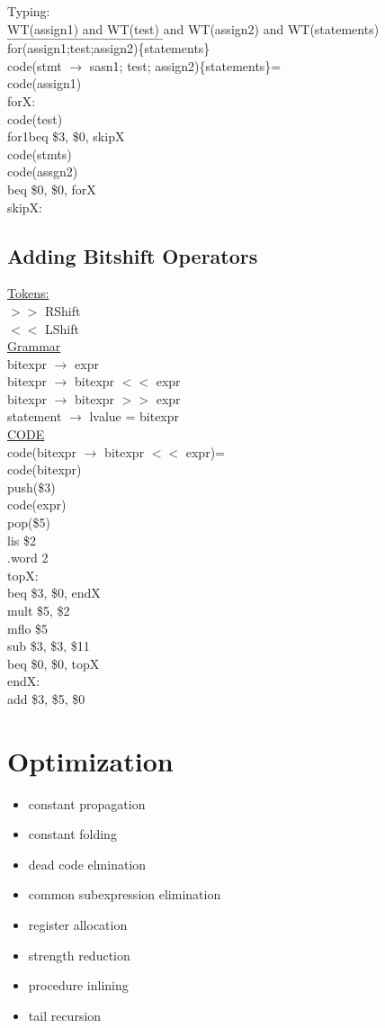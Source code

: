 \documentclass[12pt]{article}
\begin{document}
	Typing:\\
	WT(assign1) and WT(test) and WT(assign2) and WT(statements)\\
	$\_\_\_\_\_\_\_\_\_\_\_\_\_\_\_\_\_\_\_\_\_\_\_\_\_\_\_\_\_\_\_\_\_\_\_\_\_$\\
	for(assign1;test;assign2)\{statements\}\\
	
	code(stmt $\rightarrow$ sasn1; test; assign2)\{statements\}=\\
	code(assign1)\\
	forX:\\
	code(test)\\
	for1beq \$3, \$0, skipX\\
	code(stmts)\\
	code(assgn2)\\
	beq \$0, \$0, forX\\
	skipX:\\
	
	\subsection*{Adding Bitshift Operators}
	\underline{Tokens:}\\
	$>>$ RShift\\
	$<<$ LShift\\
	
	\underline{Grammar}\\
	bitexpr $\rightarrow$ expr\\
	bitexpr $\rightarrow$ bitexpr $<<$ expr\\
	bitexpr $\rightarrow$ bitexpr $>>$ expr\\
	statement $\rightarrow$ lvalue = bitexpr\\
	
	\underline{CODE}\\
	code(bitexpr $\rightarrow$ bitexpr $<<$ expr)=\\
	code(bitexpr)\\
	push(\$3)\\
	code(expr)\\
	pop(\$5)\\
	lis \$2\\
	.word 2\\
	topX:\\
	beq \$3, \$0, endX\\
	mult \$5, \$2\\
	mflo \$5\\
	sub \$3, \$3, \$11\\
	beq \$0, \$0, topX\\
	endX:\\
	add \$3, \$5, \$0\\
	
	\section*{Optimization}
	\begin{itemize}
		\item constant propagation
		\item constant folding
		\item dead code elmination
		\item common subexpression elimination
		\item register allocation
		\item strength reduction
		\item procedure inlining
		\item tail recursion
	\end{itemize}
	
	
	
\end{document}
